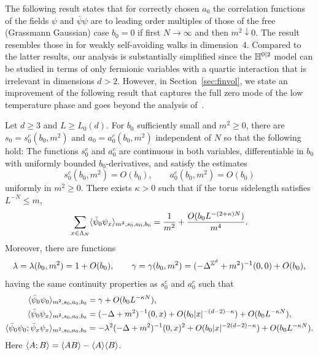 \documentclass[11pt]{amsart}
\numberwithin{equation}{section}
\numberwithin{theorem}{section}
\newcommand{\1}{{\bf 1}}
\newcommand{\clambda}{\lambda}
\newcommand{\cgamma}{\gamma}
\begin{document}
The following result states that for correctly chosen $a_0$ the
correlation functions of the fields $\psi$ and $\bar\psi\psi$ are to
leading order multiples of those of the free (Grassmann Gaussian)
case $b_0=0$ if first $N\to\infty$ and then $m^2\downarrow 0$. The
result resembles those in \cite{MR3339164,MR3345374,MR3459163} for
weakly self-avoiding walks in dimension~4. Compared to the latter
results, our analysis is substantially simplified since the
$\mathbb{H}^{0|2}$ model can be studied in terms of only fermionic variables
with a quartic interaction that is irrelevant in dimensions $d >
2$. However, in Section~\ref{sec:finvol}, we state an improvement of
the following result that captures the full zero mode of the
low temperature phase and goes beyond the analysis
of~\cite{MR3339164,MR3345374,MR3459163}.


\begin{theorem} 
  \label{thm:psi4} 
  Let $d \geq 3$ and $L \geq L_0(d)$.
  For $b_0$ sufficiently small and $m^2 \geq 0$, there are
  $s_0 = s_0^c(b_0,m^2)$ and $a_0= a_0^c(b_0,m^2)$ independent of $N$
  so that the following hold: The functions $s_0^c$ and  $a_0^c$ are continuous in both
  variables, differentiable in $b_0$ with uniformly bounded
  $b_0$-derivatives, and satisfy the estimates
\begin{equation} \label{e:thm-psi4-y0a0}
  s_0^c(b_0,m^2) = O(b_0), \qquad a_0^c(b_0,m^2) = O(b_0)
\end{equation}
uniformly in $m^2\geq 0$. There exists $\kappa>0$ such that if the
torus sidelength satisfies $L^{-N} \leq m$,
\begin{equation} 
  \label{e:psi4-suscept}
  \sum_{x\in\Lambda_N} \langle \bar\psi_0\psi_x \rangle_{m^2,s_0,a_0,b_0} = \frac{1}{m^2}
  + \frac{O(b_0L^{-(2+\kappa)N})}{m^4}.
\end{equation}
Moreover, there are functions
\begin{equation}
  \clambda = \clambda(b_0,m^2) = 1+O(b_0), \qquad \cgamma = \cgamma(b_0,m^2) = (-\Delta^{\Z^d}+m^2)^{-1}(0,0) + O(b_0),
\end{equation}
having the same continuity
properties as $s_0^c$ and $a_0^c$ such that
\begin{align}
    \label{e:psi4-00}
  \avg{\bar\psi_0\psi_0}_{m^2,s_0,a_0,b_0}
  &= \cgamma + O(b_0L^{-\kappa N}),
  \\
  \label{e:psi4-0x}
  \avg{\bar\psi_0\psi_x}_{m^2,s_0,a_0,b_0}
  &= (-\Delta+m^2)^{-1}(0,x) + O(b_0|x|^{-(d-2)-\kappa})+ O(b_0L^{-\kappa N}),
  \\
      \label{e:psi4-00xx}
  \avg{\bar\psi_0\psi_0;\bar\psi_x\psi_x}_{m^2,s_0,a_0,b_0}
  &= - \clambda^{2}(-\Delta+m^2)^{-1}(0,x)^2 + O(b_0|x|^{-2(d-2)-\kappa})+ O(b_0L^{-\kappa N}).
\end{align}
Here $\langle A;B \rangle=\langle AB \rangle-\langle A \rangle\langle B \rangle$.
\end{theorem}
\end{document}
